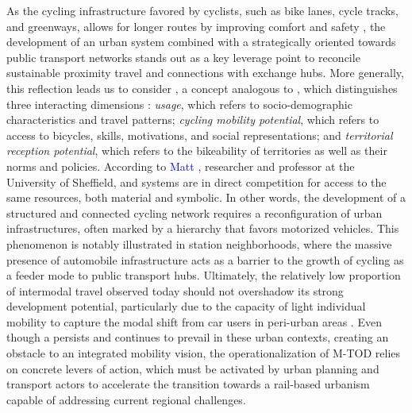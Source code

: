\begin{refsegment}
As the cycling infrastructure favored by cyclists, such as bike lanes, cycle tracks, and greenways, allows for longer routes by improving comfort and safety \textcolor{blue}{\autocite{poisson_amenagements_2019}}, the development of an urban system combined with a  strategically oriented towards public transport networks stands out as a key leverage point to reconcile sustainable proximity travel and connections with exchange hubs. More generally, this reflection leads us to consider , a concept analogous to , which distinguishes three interacting dimensions \textcolor{blue}{\autocite[20-21]{rerat_au_2019}}: \textsl{usage}, which refers to socio-demographic characteristics and travel patterns; \textsl{cycling mobility potential}, which refers to access to bicycles, skills, motivations, and social representations; and \textsl{territorial reception potential}, which refers to the bikeability of territories as well as their norms and policies. According to \textcolor{blue}{Matt} \textcolor{blue}{\textcite[492]{watson_how_2012}}, researcher and professor at the University of Sheffield,  and  systems are in direct competition for access to the same resources, both material and symbolic. In other words, the development of a structured and connected cycling network requires a reconfiguration of urban infrastructures, often marked by a hierarchy that favors motorized vehicles. This phenomenon is notably illustrated in station neighborhoods, where the massive presence of automobile infrastructure acts as a barrier to the growth of cycling as a feeder mode to public transport hubs. Ultimately, the relatively low proportion of intermodal travel observed today should not overshadow its strong development potential, particularly due to the capacity of light individual mobility to capture the modal shift from car users in peri-urban areas \textcolor{blue}{\autocite[22]{ulles_quelle_2024}}. Even though a  persists and continues to prevail \textcolor{blue}{\autocite[656]{tan_identifying_2014}} in these urban contexts, creating an obstacle to an integrated mobility vision, the operationalization of \acrshort{M-TOD} relies on concrete levers of action, which must be activated by urban planning and transport actors to accelerate the transition towards a rail-based urbanism capable of addressing current regional challenges.%


\end{refsegment}
